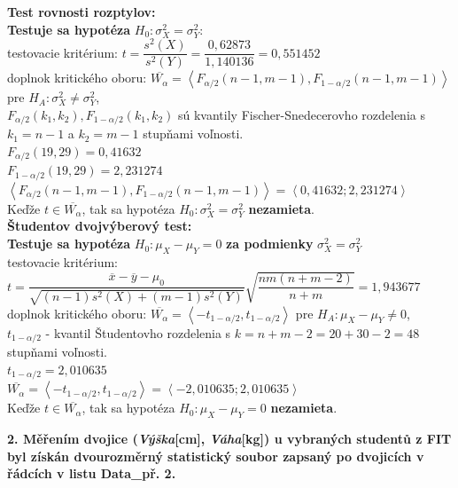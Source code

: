\documentclass[pdftex, 11pt, a4paper, titlepage]{article}
\begin{document}
    \newpage
    \noindent
    \textbf{Test rovnosti rozptylov:}\\
    \textbf{Testuje sa hypotéza} $H_0 : \sigma_X^2 = \sigma_Y^2$:\\

    \noindent
    testovacie kritérium: $t = \dfrac{s^2(X)}{s^2(Y)} = \dfrac{0,62873}{1,140136} = 0,551452$\\
    doplnok kritického oboru: $\overline{W_\alpha} = \left\langle F_{\alpha/2}(n-1,m-1), F_{1-\alpha/2}(n-1,m-1) \right\rangle$ pre $H_A : \sigma_X^2 \neq \sigma_Y^2$,\\
    $F_{\alpha/2}(k_1,k_2), F_{1-\alpha/2}(k_1,k_2)$ sú kvantily Fischer-Snedecerovho rozdelenia s $k_1 = n-1$ a $k_2 = m-1$ stupňami voľnosti.\\
    $F_{\alpha/2}(19,29) = 0,41632$\\
    $F_{1-\alpha/2}(19,29) = 2,231274$\\
    $\left\langle F_{\alpha/2}(n-1,m-1), F_{1-\alpha/2}(n-1,m-1) \right\rangle = \left\langle 0,41632 ; 2,231274 \right\rangle$\\
    Keďže $t \in \overline{W_\alpha}$, tak sa hypotéza $H_0 : \sigma_X^2 = \sigma_Y^2$ \textbf{nezamieta}.\\

    \noindent
    \textbf{Študentov dvojvýberový test:}\\
    \textbf{Testuje sa hypotéza} $H_0 : \mu_X - \mu_Y = 0$ \textbf{za podmienky} $\sigma_X^2 = \sigma_Y^2$\\

    \noindent
    testovacie kritérium: $t = \dfrac{\overline{x}-\overline{y}-\mu_0}{\sqrt{(n-1)s^2(X)+(m-1)s^2(Y)}}\sqrt{\dfrac{nm(n+m-2)}{n+m}} = 1,943677$\\
    doplnok kritického oboru: $\overline{W_\alpha} = \left\langle -t_{1-\alpha/2}, t_{1-\alpha/2} \right\rangle$ pre $H_A : \mu_X - \mu_Y \neq 0$,\\
    $t_{1-\alpha/2}$ - kvantil Študentovho rozdelenia s $k=n+m-2=20+30-2=48$ stupňami voľnosti.\\
    $t_{1-\alpha/2} = 2,010635$\\
    $\overline{W_\alpha} = \left\langle -t_{1-\alpha/2}, t_{1-\alpha/2} \right\rangle = \left\langle -2,010635 ; 2,010635 \right\rangle$\\
    Keďže $t \in \overline{W_\alpha}$, tak sa hypotéza $H_0 : \mu_X - \mu_Y = 0$ \textbf{nezamieta}.

    \newpage
    \noindent
    \textbf{2. Měřením dvojice (\emph{Výška}[cm], \emph{Váha}[kg]) u vybraných studentů
    z FIT byl získán dvourozměrný statistický soubor zapsaný po dvojicích
    v řádcích v listu Data\_př. 2.}\\
\end{document}
